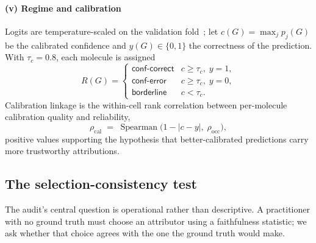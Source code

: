 \paragraph{(v) Regime and calibration} Logits are temperature-scaled on the
validation fold~\cite{calibration}; let $c(G)=\max_j p_j(G)$ be the calibrated
confidence and $y(G)\in\{0,1\}$ the correctness of the prediction. With
$\tau_c=0.8$, each molecule is assigned
\begin{equation}
  R(G)=
  \begin{cases}
    \textsf{conf-correct} & c\ge\tau_c,\; y=1,\\
    \textsf{conf-error}   & c\ge\tau_c,\; y=0,\\
    \textsf{borderline}   & c<\tau_c .
  \end{cases}
  \label{eq:regime}
\end{equation}
Calibration linkage is the within-cell rank correlation between per-molecule
calibration quality and reliability,
\begin{equation}
  \rho_{\mathrm{cal}} \;=\; \operatorname{Spearman}\big(1-|c-y|,\;
  \rho_{\mathrm{occ}}\big),
  \label{eq:callink}
\end{equation}
positive values supporting the hypothesis that better-calibrated predictions
carry more trustworthy attributions.

\subsection{The selection-consistency test}
\label{sec:selectiondef}

The audit's central question is operational rather than descriptive. A
practitioner with no ground truth must choose an attributor using a
faithfulness statistic; we ask whether that choice agrees with the one the
ground truth would make.

